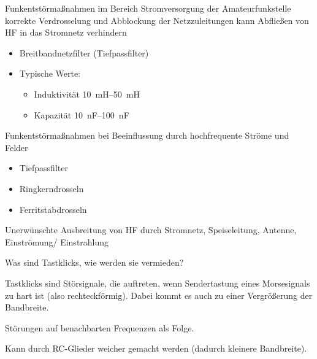 \documentclass[avery5371,grid,frame,a4paper]{flashcards}
\newcommand{\card}[3]{
  \begin{flashcard}[{\chap} -- #1]{#2}#3\end{flashcard}
}
\begin{document}
\card{91}{Funkentstörmaßnahmen im Bereich Stromversorgung der Amateurfunkstelle}{
  korrekte Verdrosselung und Abblockung der Netzzuleitungen kann Abfließen von HF in das Stromnetz verhindern
  \begin{itemize}
    \item Breitbandnetzfilter (Tiefpassfilter)
    \item Typische Werte:
      \begin{itemize}
        \item Induktivität \SIrange{10}{50}{\milli\henry}
        \item Kapazität \SIrange{10}{100}{\nano\farad}
      \end{itemize}
  \end{itemize}
}
\card{92}{Funkentstörmaßnahmen bei Beeinflussung durch hochfrequente Ströme und Felder}{
  \begin{itemize}
    \item Tiefpassfilter
    \item Ringkerndrosseln
    \item Ferritstabdrosseln

  \end{itemize}
  Unerwünschte Ausbreitung von HF durch Stromnetz, Speiseleitung, Antenne, Einströmung/ Einstrahlung
}
\card{93}{Was sind Tastklicks, wie werden sie vermieden?}{
  \item
  Tastklicks sind Störsignale, die auftreten, wenn Sendertastung eines Morsesignals zu hart ist (also rechteckförmig). Dabei kommt es auch zu einer Vergrößerung der Bandbreite.

  \item
  Störungen auf benachbarten Frequenzen als Folge.

  \item
  Kann durch RC-Glieder weicher gemacht werden (dadurch kleinere Bandbreite).
}
\end{document}
